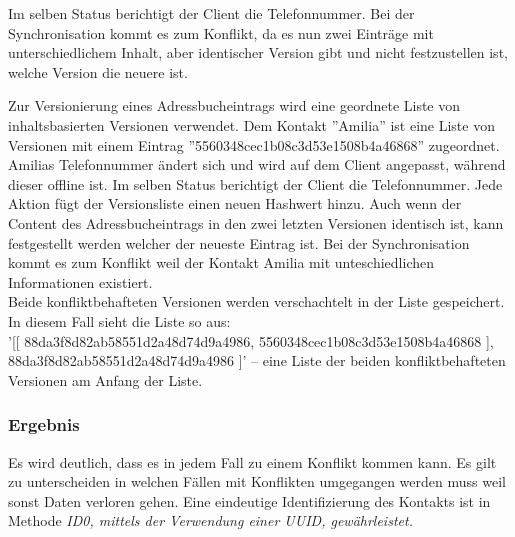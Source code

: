\begin{description}[leftmargin=0.5cm,style=nextline]
    Im selben Status berichtigt der Client die Telefonnummer. Bei der Synchronisation kommt es zum Konflikt, da es nun zwei Einträge mit unterschiedlichem Inhalt, aber identischer Version gibt und nicht festzustellen ist, welche Version die neuere ist.\\
  \item[Methode V4 -- Liste von inhaltsbasierten Versionen:]
    Zur Versionierung eines Adressbucheintrags wird eine geordnete Liste von inhaltsbasierten Versionen verwendet.
    Dem Kontakt ''Amilia'' ist eine Liste von Versionen mit einem Eintrag ''5560348cec1b08c3d53e1508b4a46868'' zugeordnet.
    Amilias Telefonnummer ändert sich und wird auf dem Client angepasst, während dieser offline ist. Im selben Status berichtigt der Client die Telefonnummer.
    Jede Aktion fügt der Versionsliste einen neuen Hashwert hinzu.
    Auch wenn der Content des Adressbucheintrags in den zwei letzten Versionen identisch ist, kann festgestellt werden welcher der neueste Eintrag ist.
    Bei der Synchronisation kommt es zum Konflikt weil der Kontakt Amilia mit unteschiedlichen Informationen existiert.\\
    Beide konfliktbehafteten Versionen werden verschachtelt in der Liste gespeichert.
    In diesem Fall sieht die Liste so aus: \\
    '[[ 88da3f8d82ab58551d2a48d74d9a4986, 5560348cec1b08c3d53e1508b4a46868 ], 88da3f8d82ab58551d2a48d74d9a4986 ]' -- eine Liste der beiden konfliktbehafteten Versionen am Anfang der Liste.
\end{description}
%
%
\subsubsection*{Ergebnis}
Es wird deutlich, dass es in jedem Fall zu einem Konflikt kommen kann. Es gilt zu unterscheiden in welchen Fällen mit Konflikten umgegangen werden muss weil sonst Daten verloren gehen.
Eine eindeutige Identifizierung des Kontakts ist in Methode \it{ID0}, mittels der Verwendung einer \gls{UUID}, gewährleistet.
